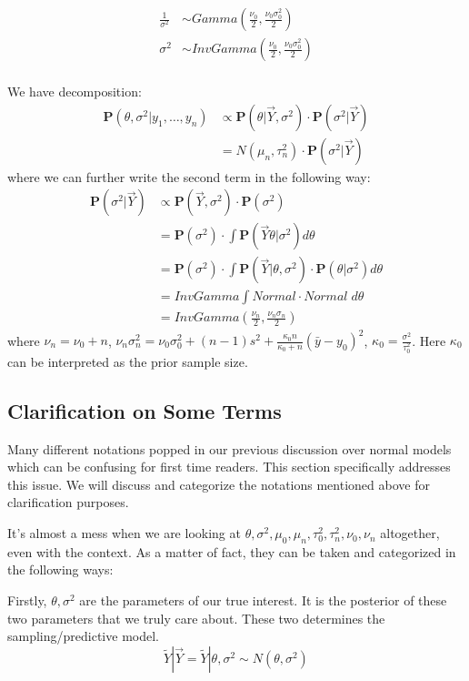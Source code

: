 \begin{align*}
    \frac{1}{\sigma^2} &\sim Gamma(\frac{\nu_0}{2}, \frac{\nu_0\sigma_0^2}{2}) \\
    \sigma^2 &\sim InvGamma(\frac{\nu_0}{2}, \frac{\nu_0\sigma_0^2}{2}) \\
\end{align*}

We have decomposition:
\begin{align*}
    \mathbf{P}(\theta, \sigma^2 | y_1, \ldots, y_n) &\propto \mathbf{P}(\theta | \vec{Y}, \sigma^2) \cdot \mathbf{P}(\sigma^2 | \vec{Y}) \\
    &= N(\mu_n, \tau_n^2) \cdot \mathbf{P}(\sigma^2 | \vec{Y})
\end{align*}
where we can further write the second term in the following way:
\begin{align*}
    \mathbf{P}(\sigma^2 | \vec{Y}) &\propto \mathbf{P}(\vec{Y}, \sigma^2) \cdot \mathbf{P}(\sigma^2) \\
    &= \mathbf{P}(\sigma^2) \cdot \int \mathbf{P}(\vec{Y} \theta | \sigma^2) d\theta \\
    &= \mathbf{P}(\sigma^2) \cdot \int \mathbf{P}(\vec{Y} | \theta, \sigma^2) \cdot \mathbf{P}(\theta | \sigma^2) d\theta \\
    &=InvGamma \int Normal \cdot Normal \;d\theta \\
    &= InvGamma(\frac{\nu_n}{2}, \frac{\nu_n\sigma_n}{2})
\end{align*}
where $\nu_n = \nu_0 + n$, $\nu_n\sigma_n^2 = \nu_0\sigma_0^2 + (n-1)s^2 + \frac{\kappa_0n}{\kappa_0 + n}(\bar{y} - y_0)^2$, $\kappa_0 = \frac{\sigma^2}{\tau_0^2}$. Here $\kappa_0$ can be interpreted as the prior sample size. 

\subsection{Clarification on Some Terms}
Many different notations popped in our previous discussion over normal models which can be confusing for first time readers. This section specifically addresses this issue. We will discuss and categorize the notations mentioned above for clarification purposes. 

It's almost a mess when we are looking at $\theta, \sigma^2, \mu_0, \mu_n, \tau_0^2, \tau_n^2, \nu_0, \nu_n$ altogether, even with the context. As a matter of fact, they can be taken and categorized in the following ways:

Firstly, $\theta, \sigma^2$ are the parameters of our true interest. It is the posterior of these two parameters that we truly care about. These two determines the sampling/predictive model. 
\begin{equation*}
    \tilde{Y} | \vec{Y} = \tilde{Y} | \theta, \sigma^2 \sim N(\theta, \sigma^2)
\end{equation*}

